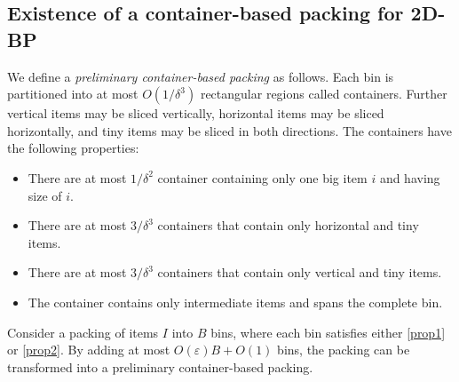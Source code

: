 \documentclass[a4paper,UKenglish,cleveref, autoref, thm-restate]{lipics-v2021}
\newcommand{\eps}{\varepsilon}
\newcommand{\inter}{intermediate\xspace}
\newcommand{\bigy}{big\xspace}
\newcommand{\tin}{tiny\xspace}
\begin{document}
\subsection{Existence of a container-based packing for 2D-BP}

We define a \emph{preliminary container-based packing} as follows.
Each bin is partitioned into at most $O(1/\delta^3)$ rectangular regions called containers. 
Further vertical items may be sliced vertically, horizontal items may be sliced horizontally, and \tin items may be sliced in both directions.
The containers have the following properties:
\begin{itemize}
        \item There are at most $1/\delta^2$ container containing only one \bigy item $i$ and having size of $i$. 
        \item There are at most $3/\delta^3$ containers that contain only horizontal and \tin items. 
        \item There are at most $3/\delta^3$ containers that contain only vertical and \tin items. 
        \item The container contains only \inter items and spans the complete bin.
\end{itemize}

\begin{lemma}
\label{lem:structure-2bp-1}
Consider a packing of items $I$ into $B$ bins, where each bin satisfies either \cref{prop1} or \cref{prop2}.  
By adding at most ${O}(\eps)B+O(1)$ bins, the packing can be transformed into a preliminary container-based packing.
\end{lemma}
\end{document}
